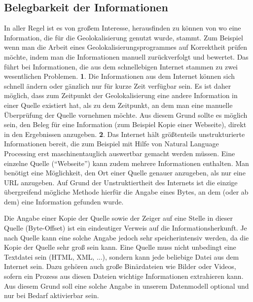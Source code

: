 \subsection{Belegbarkeit der Informationen}
In aller Regel ist es von großem Interesse, herausfinden zu können von wo eine Information, die für die Geolokalisierung genutzt wurde, stammt. Zum Beispiel wenn man die Arbeit eines Geolokalisierungsprogrammes auf Korrektheit prüfen möchte, indem man die Informationen manuell zurückverfolgt und bewertet. Das führt bei Informationen, die aus dem schnellebigen Internet stammen zu zwei wesentlichen Problemen. \textbf{1}. Die Informationen aus dem Internet können sich schnell ändern oder gänzlich nur für kurze Zeit verfügbar sein. Es ist daher möglich, dass zum Zeitpunkt der Geolokalisierung eine andere Information in einer Quelle existiert hat, als zu dem Zeitpunkt, an dem man eine manuelle Überprüfung der Quelle vornehmen möchte. Aus diesem Grund sollte es möglich sein, den Beleg für eine Information (zum Beispiel Kopie einer Webseite), direkt in den Ergebnissen anzugeben. \textbf{2}. Das Internet hält größtenteils unstrukturierte Informationen bereit, die zum Beispiel mit Hilfe von Natural Language Processing erst maschinentauglich auswertbar gemacht werden müssen. Eine einzelne Quelle (``Webseite'') kann zudem mehrere Informationen enthalten. Man benötigt eine Möglichkeit, den Ort einer Quelle genauer anzugeben, als nur eine URL anzugeben. Auf Grund der Unstruktiertheit des Internets ist die einzige übergreifend mögliche Methode hierfür die Angabe eines Bytes, an dem (oder ab dem) eine Information gefunden wurde.

Die Angabe einer Kopie der Quelle sowie der Zeiger auf eine Stelle in dieser Quelle (Byte-Offset) ist ein eindeutiger Verweis auf die Informationsherkunft. Je nach Quelle kann eine solche Angabe jedoch sehr speicherintensiv werden, da die Kopie der Quelle sehr groß sein kann. Eine Quelle muss nicht unbedingt eine Textdatei sein (HTML, XML, ...), sondern kann jede beliebige Datei aus dem Internet sein. Dazu gehören auch große Binärdateien wie Bilder oder Videos, sofern ein Prozess aus diesen Dateien wichtige Informationen extrahieren kann. Aus diesem Grund soll eine solche Angabe in unserem Datenmodell optional und nur bei Bedarf aktivierbar sein.

